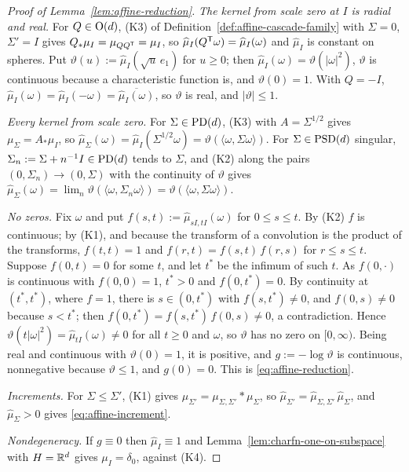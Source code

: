 \begin{proof}[Proof of Lemma~\ref{lem:affine-reduction}]
\emph{The kernel from scale zero at $I$ is radial and real.} For $Q \in \mathrm{O}(d)$, (K3) of
Definition~\ref{def:affine-cascade-family} with $\Sigma = 0$,
$\Sigma' = I$ gives $Q_*\mu_I = \mu_{QQ^{\mathsf{T}}} = \mu_I$, so
$\widehat\mu_I(Q^{\mathsf{T}}\omega) = \widehat\mu_I(\omega)$ and $\widehat\mu_I$ is constant on spheres.
Put $\vartheta(u) := \widehat\mu_I(\sqrt u\,e_1)$ for $u \ge 0$; then
$\widehat\mu_I(\omega) = \vartheta(|\omega|^2)$, $\vartheta$ is continuous because a characteristic
function is, and $\vartheta(0) = 1$. With $Q = -I$,
$\widehat\mu_I(\omega) = \widehat\mu_I(-\omega) = \overline{\widehat\mu_I(\omega)}$, so $\vartheta$ is
real, and $|\vartheta| \le 1$.

\emph{Every kernel from scale zero.} For $\Sigma \in \mathrm{PD}(d)$, (K3) with $A = \Sigma^{1/2}$ gives
$\mu_\Sigma = A_*\mu_I$, so $\widehat\mu_\Sigma(\omega) = \widehat\mu_I(\Sigma^{1/2}\omega)
= \vartheta(\langle\omega,\Sigma\omega\rangle)$. For $\Sigma \in \mathrm{PSD}(d)$ singular,
$\Sigma_n := \Sigma + n^{-1}I \in \mathrm{PD}(d)$ tends to $\Sigma$, and (K2) along the pairs
$(0,\Sigma_n) \to (0,\Sigma)$ with the continuity of $\vartheta$ gives
$\widehat\mu_\Sigma(\omega) = \lim_n\vartheta(\langle\omega,\Sigma_n\omega\rangle)
= \vartheta(\langle\omega,\Sigma\omega\rangle)$.

\emph{No zeros.} Fix $\omega$ and put $f(s,t) := \widehat\mu_{sI,tI}(\omega)$ for $0 \le s \le t$.
By (K2) $f$ is continuous; by (K1), and because the transform of a convolution is the product of
the transforms, $f(t,t) = 1$ and $f(r,t) = f(s,t)\,f(r,s)$ for $r \le s \le t$. Suppose
$f(0,t) = 0$ for some $t$, and let $t^*$ be the infimum of such $t$. As $f(0,\cdot)$ is continuous
with $f(0,0) = 1$, $t^* > 0$ and $f(0,t^*) = 0$. By continuity at $(t^*,t^*)$, where $f = 1$, there
is $s \in (0,t^*)$ with $f(s,t^*) \ne 0$, and $f(0,s) \ne 0$ because $s < t^*$; then
$f(0,t^*) = f(s,t^*)\,f(0,s) \ne 0$, a contradiction. Hence
$\vartheta(t|\omega|^2) = \widehat\mu_{tI}(\omega) \ne 0$ for all $t \ge 0$ and $\omega$, so $\vartheta$
has no zero on $[0,\infty)$. Being real and continuous with $\vartheta(0) = 1$, it is positive, and
$g := -\log\vartheta$ is continuous, nonnegative because $\vartheta \le 1$, and $g(0) = 0$. This is
\ref{eq:affine-reduction}.

\emph{Increments.} For $\Sigma \le \Sigma'$, (K1) gives $\mu_{\Sigma'} = \mu_{\Sigma,\Sigma'} *
\mu_\Sigma$, so $\widehat\mu_{\Sigma'} = \widehat\mu_{\Sigma,\Sigma'}\,\widehat\mu_\Sigma$, and
$\widehat\mu_\Sigma > 0$ gives \ref{eq:affine-increment}.

\emph{Nondegeneracy.} If $g \equiv 0$ then $\widehat\mu_I \equiv 1$ and
Lemma~\ref{lem:charfn-one-on-subspace} with $H = \mathbb{R}^d$ gives $\mu_I = \delta_0$, against (K4).
\end{proof}

